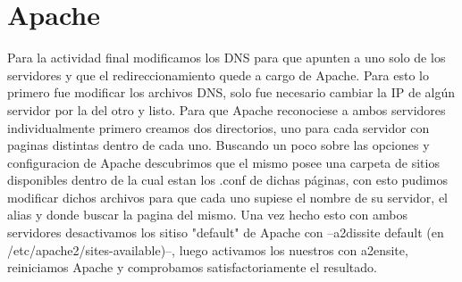 \documentclass[12pt,a4paper]{article}
\begin{document}
	
	\section{Apache}
	Para la actividad final modificamos los DNS para que apunten a uno solo de los servidores y que el redireccionamiento quede a cargo de Apache.
	Para esto lo primero fue modificar los archivos DNS, solo fue necesario cambiar la IP de algún servidor por la del otro y listo.
	Para que Apache reconociese a ambos servidores individualmente primero creamos dos directorios, uno para cada servidor con paginas distintas dentro de cada uno.
	Buscando un poco sobre las opciones y configuracion de Apache descubrimos que el mismo posee una carpeta de sitios disponibles dentro de la cual estan los .conf de dichas páginas, con esto pudimos modificar dichos archivos para que cada uno supiese el nombre de su servidor, el alias y donde buscar la pagina del mismo.
	Una vez hecho esto con ambos servidores desactivamos los sitiso "default" de Apache con --a2dissite default (en /etc/apache2/sites-available)--, luego activamos los nuestros con a2ensite, reiniciamos Apache y comprobamos satisfactoriamente el resultado. 
\end{document}
